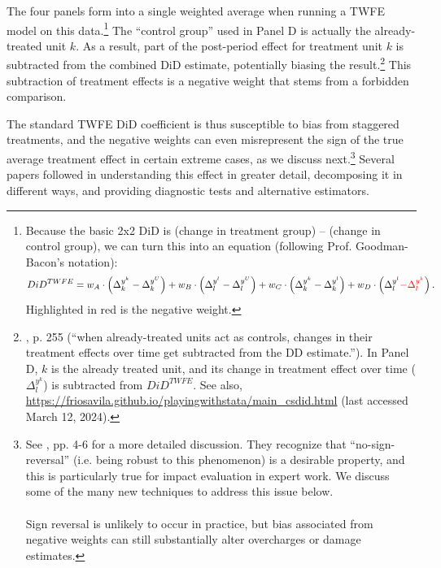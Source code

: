 \documentclass[12pt]{article}
\begin{document}
The four panels form into a single weighted average when running a TWFE model on this data.\footnote{Because the basic 2x2 DiD is (change in treatment group) – (change in control group), we can turn this into an equation (following Prof. Goodman-Bacon’s notation):
\begin{equation*}
    DiD^{TWFE} = w_A\cdot\left(\Delta_k^{y^k} - \Delta_k^{y^U}\right) + w_B\cdot\left(\Delta_l^{y^l} - \Delta_l^{y^U}\right) + w_C\cdot\left(\Delta_k^{y^k} - \Delta_k^{y^l}\right) + w_D\cdot\left(\Delta_l^{y^l} \textcolor{red}{- \Delta_l^{y^k}}\right).
\end{equation*}
Highlighted in red is the negative weight.}  The “control group” used in Panel D is actually the already-treated unit $k$. As a result, part of the post-period effect for treatment unit $k$ is subtracted from the combined DiD estimate, potentially biasing the result.\footnote{\citet{goodman-bacon2021a}, p. 255 (“when already-treated units act as controls, changes in their treatment effects over time get subtracted from the DD estimate.”). In Panel D, $k$ is the already treated unit, and its change in treatment effect over time ($\Delta_l^{y^k}$) is subtracted from $DiD^{TWFE}$. See also, \url{https://friosavila.github.io/playingwithstata/main_csdid.html} (last accessed March 12, 2024).}  This subtraction of treatment effects is a negative weight that stems from a forbidden comparison.

The standard TWFE DiD coefficient is thus susceptible to bias from staggered treatments, and the negative weights can even misrepresent the sign of the true average treatment effect in certain extreme cases, as we discuss next.\footnote{See \citet{de2023two}, pp. 4-6 for a more detailed discussion. They recognize that “no-sign-reversal” (i.e. being robust to this phenomenon) is a desirable property, and this is particularly true for impact evaluation in expert work. We discuss some of the many new techniques to address this issue below. \\\\
Sign reversal is unlikely to occur in practice, but bias associated from negative weights can still substantially alter overcharges or damage estimates.}  Several papers followed in understanding this effect in greater detail, decomposing it in different ways, and providing diagnostic tests and alternative estimators.
\end{document}
